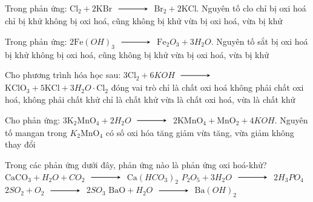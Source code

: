 \begin{ex}
	Trong phản ứng: $\mathrm{Cl}_2+2\mathrm{KBr} $ $\xrightarrow$ $ \mathrm{Br}_2+2\mathrm{KCl}$. Nguyên tố clo
	\choice
	{chỉ bị oxi hoá}
	{\True chỉ bị khử}
	{không bị oxi hoá, cũng không bị khử}
	{vừa bị oxi hoá, vừa bị khử}
\end{ex}
\begin{ex}
	Trong phản ứng: $2 \mathrm{Fe}(OH)_3 $ $\xrightarrow$ $ \mathrm{Fe}_2 O_3+3 H_2O$. Nguyên tố sắt
	\choice
	{bị oxi hoá}
	{bị khử}
	{\True không bị oxi hoá, cũng không bị khử}
	{vừa bị oxi hoá, vừa bị khử}
\end{ex}
\begin{ex}
	Cho phương trình hóa học sau: $3 \mathrm{Cl}_2+6 KOH $ $\xrightarrow$ $ \mathrm{KClO}_3+5 \mathrm{KCl}+3 H_2O \cdot \mathrm{Cl}_2$ đóng vai trò
	\choice
	{chỉ là chất oxi hoá}
	{không phải chất oxi hoá, không phải chất khử}
	{chỉ là chất khử}
	{\True vừa là chất oxi hoá, vừa là chất khử}
\end{ex}
\begin{ex}
	Cho phản ứng: $3\mathrm{K}_2 \mathrm{MnO}_4+2 H_2O $ $\xrightarrow$ $ 2 \mathrm{KMnO}_4+\mathrm{MnO}_2+4 KOH$. Nguyên tố mangan trong $K_2\mathrm{MnO}_4$ có số oxi hóa
	\choice
	{tăng}
	{giảm}
	{\True vừa tăng, vừa giảm}
	{không thay đổi}
\end{ex}
\begin{ex}
	Trong các phản ứng dưới đây, phản ứng nào là phản ứng oxi hoá-khử?
	\choice
	{$\mathrm{CaCO}_3+H_2O+CO_2 $ $\xrightarrow$ $ \mathrm{Ca}\left(HCO_3\right)_2$}
	{$P_2 O_5+3 H_2O $ $\xrightarrow$ $ 2 H_3 PO_4$}
	{\True $2SO_2+O_2$ $\xrightarrow$ $ 2SO_3$}
	{$\mathrm{BaO}+H_2O $ $\xrightarrow$ $ \mathrm{Ba}(OH)_2$}
\end{ex}
